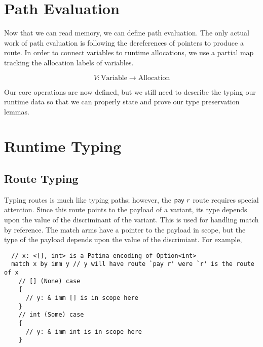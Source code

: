 \section*{Path Evaluation}

Now that we can read memory, we can define path evaluation.
The only actual work of path evaluation is following the dereferences of pointers
to produce a route. In order to connect variables to runtime allocations, we use
a partial map tracking the allocation labels of variables.

$$ V : \mathrm{Variable} \to \mathrm{Allocation} $$



Our core operations are now defined,
but we still need to describe the typing our runtime data
so that we can properly state and prove our type preservation lemmas.

\section*{Runtime Typing}
\subsection*{Route Typing}
Typing routes is much like typing paths; however, the $\mathsf{pay}~{r}$ route requires
special attention. Since this route points to the payload of a variant,
its type depends upon the value of the discriminant of the variant.
This is used for handling match by reference.
The match arms have a pointer to the payload in scope, but the type of the
payload depends upon the value of the discrimiant.
For example,
\begin{verbatim}
  // x: <[], int> is a Patina encoding of Option<int>
  match x by imm y // y will have route `pay r' were `r' is the route of x
    // [] (None) case
    {
      // y: & imm [] is in scope here
    }
    // int (Some) case
    {
      // y: & imm int is in scope here
    }
\end{verbatim}

